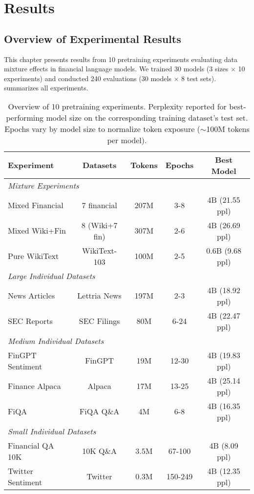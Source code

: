 \chapter{Results}


\section{Overview of Experimental Results}

This chapter presents results from 10 pretraining experiments evaluating data mixture effects in financial language models. We trained 30 models (3 sizes $\times$ 10 experiments) and conducted 240 evaluations (30 models $\times$ 8 test sets).  summarizes all experiments.

\begin{table}[h]
\centering
\small
\begin{tabular}{lcccc}
\toprule
\textbf{Experiment} & \textbf{Datasets} & \textbf{Tokens} & \textbf{Epochs} & \textbf{Best Model} \\
\midrule
\multicolumn{5}{l}{\textit{Mixture Experiments}} \\
Mixed Financial & 7 financial & 207M & 3-8 & 4B (21.55 ppl) \\
Mixed Wiki+Fin & 8 (Wiki+7 fin) & 307M & 2-6 & 4B (26.69 ppl) \\
Pure WikiText & WikiText-103 & 100M & 2-5 & 0.6B (9.68 ppl) \\
\midrule
\multicolumn{5}{l}{\textit{Large Individual Datasets}} \\
News Articles & Lettria News & 197M & 2-3 & 4B (18.92 ppl) \\
SEC Reports & SEC Filings & 80M & 6-24 & 4B (22.47 ppl) \\
\midrule
\multicolumn{5}{l}{\textit{Medium Individual Datasets}} \\
FinGPT Sentiment & FinGPT & 19M & 12-30 & 4B (19.83 ppl) \\
Finance Alpaca & Alpaca & 17M & 13-25 & 4B (25.14 ppl) \\
FiQA & FiQA Q\&A & 4M & 6-8 & 4B (16.35 ppl) \\
\midrule
\multicolumn{5}{l}{\textit{Small Individual Datasets}} \\
Financial QA 10K & 10K Q\&A & 3.5M & 67-100 & 4B (8.09 ppl) \\
Twitter Sentiment & Twitter & 0.3M & 150-249 & 4B (12.35 ppl) \\
\bottomrule
\end{tabular}
\caption{Overview of 10 pretraining experiments. Perplexity reported for best-performing model size on the corresponding training dataset's test set. Epochs vary by model size to normalize token exposure ($\sim$100M tokens per model).}
\label{tab:experiments_overview}
\end{table}

